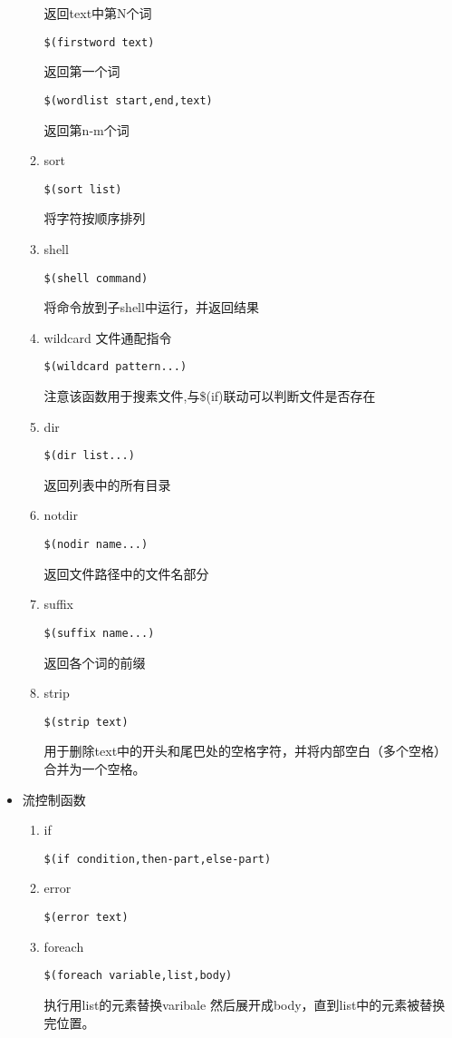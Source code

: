 \begin{itemize}
\begin{enumerate}
			返回text中第N个词
\begin{lstlisting}[numbers = none]
	$(firstword text)
\end{lstlisting}
			返回第一个词
\begin{lstlisting}[numbers = none]
	$(wordlist start,end,text)
\end{lstlisting}			
			返回第n-m个词
			\item sort
\begin{lstlisting}[numbers = none]
	$(sort list)
\end{lstlisting}	
			将字符按顺序排列
			\item shell
\begin{lstlisting}[numbers = none]
	$(shell command)
\end{lstlisting}	
			将命令放到子shell中运行，并返回结果
			\item wildcard 文件通配指令
\begin{lstlisting}[numbers = none]
	$(wildcard pattern...)
\end{lstlisting}			
			注意该函数用于搜素文件,与\$(if)联动可以判断文件是否存在
			\item dir 
\begin{lstlisting}[numbers = none]
	$(dir list...)
\end{lstlisting}		
			返回列表中的所有目录	
			\item notdir
\begin{lstlisting}[numbers = none]
	$(nodir name...)
\end{lstlisting}			
			返回文件路径中的文件名部分
			\item suffix
\begin{lstlisting}[numbers = none]
	$(suffix name...)
\end{lstlisting}			
			返回各个词的前缀	
			\item strip
\begin{lstlisting}[numbers = none]
	$(strip text)
\end{lstlisting}
			用于删除text中的开头和尾巴处的空格字符，并将内部空白（多个空格）合并为一个空格。
		\end{enumerate}
		\item 流控制函数
			\begin{enumerate}
				\item if 
\begin{lstlisting}[numbers = none]
	$(if condition,then-part,else-part)
\end{lstlisting}
				\item error 
\begin{lstlisting}[numbers = none]
	$(error text)
\end{lstlisting}
				\item foreach
\begin{lstlisting}[numbers = none]
	$(foreach variable,list,body)
\end{lstlisting}
			执行用list的元素替换varibale 然后展开成body，直到list中的元素被替换完位置。
				
			\end{enumerate}
	\end{itemize}